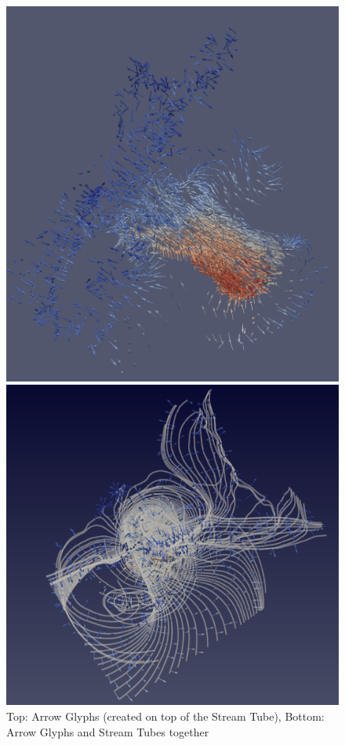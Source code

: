 \documentclass[a4paper,11pt]{article}
\theoremstyle{mytheor}
\begin{document}
\begin{figure}[!h]
    \centering
    \includegraphics[scale=0.6]{Figures/P2_4_1.PNG}
    
    \vspace{0.5 cm}
    \includegraphics[scale=0.5]{Figures/P2_4_2.PNG}
    \caption{Top: Arrow Glyphs (created on top of the Stream Tube), Bottom: Arrow Glyphs and Stream Tubes together}
    \label{p2_5}
\end{figure}
\clearpage
\end{document}
